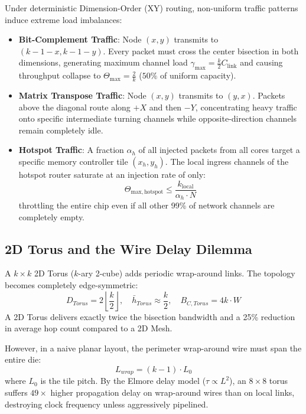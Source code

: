 Under deterministic Dimension-Order (XY) routing, non-uniform traffic patterns induce extreme load imbalances:
\begin{itemize}
    \item \textbf{Bit-Complement Traffic}: Node $(x, y)$ transmits to $(k - 1 - x, k - 1 - y)$. Every packet must cross the center bisection in both dimensions, generating maximum channel load $\gamma_{\mathrm{max}} = \frac{k}{2} C_{\mathrm{link}}$ and causing throughput collapse to $\Theta_{\mathrm{max}} = \frac{2}{k}$ ($50\%$ of uniform capacity).
    \item \textbf{Matrix Transpose Traffic}: Node $(x, y)$ transmits to $(y, x)$. Packets above the diagonal route along $+X$ and then $-Y$, concentrating heavy traffic onto specific intermediate turning channels while opposite-direction channels remain completely idle.
    \item \textbf{Hotspot Traffic}: A fraction $\alpha_h$ of all injected packets from all cores target a specific memory controller tile $(x_h, y_h)$. The local ingress channels of the hotspot router saturate at an injection rate of only:
    \begin{equation}
    \Theta_{\mathrm{max, hotspot}} \le \frac{k_{\mathrm{local}}}{\alpha_h \cdot N}
    \label{eq:ch4_hotspot_bound}
    \end{equation}
    throttling the entire chip even if all other 99\% of network channels are completely empty.
\end{itemize}

\subsection{2D Torus and the Wire Delay Dilemma}
A $k \times k$ 2D Torus ($k$-ary 2-cube) adds periodic wrap-around links. The topology becomes completely edge-symmetric:
\begin{equation}
D_{Torus} = 2 \left\lfloor \frac{k}{2} \right\rfloor, \quad \bar{h}_{Torus} \approx \frac{k}{2}, \quad B_{C, Torus} = 4k \cdot W
\label{eq:ch4_torus_metrics}
\end{equation}
A 2D Torus delivers exactly twice the bisection bandwidth and a 25\% reduction in average hop count compared to a 2D Mesh.

However, in a naive planar layout, the perimeter wrap-around wire must span the entire die:
\begin{equation}
L_{wrap} = (k - 1) \cdot L_0
\label{eq:ch4_wrap_wire}
\end{equation}
where $L_0$ is the tile pitch. By the Elmore delay model ($\tau \propto L^2$), an $8 \times 8$ torus suffers $49\times$ higher propagation delay on wrap-around wires than on local links, destroying clock frequency unless aggressively pipelined.

